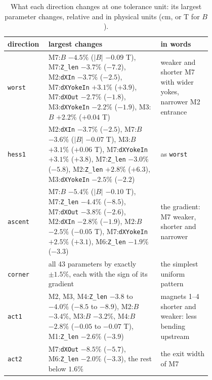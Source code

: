 \documentclass[11pt,a4paper]{article}
\begin{document}
\begin{table}[t]
\centering
\caption{What each direction changes at one tolerance unit: its largest parameter changes,
relative and in physical units (cm, or T for $B$).}
\label{tab:dirs}
\small
\begin{tabular}{l p{0.55\linewidth} p{0.25\linewidth}}
\toprule
direction & largest changes & in words \\
\midrule
\texttt{worst}  & M7:$B$ $-4.5\%$ ($|B|$ $-0.09$ T), M7:\texttt{Z\_len} $-3.7\%$ ($-7.2$),
                  M2:\texttt{dXIn} $-3.7\%$ ($-2.5$), M7:\texttt{dXYokeIn} $+3.1\%$ ($+3.9$),
                  M7:\texttt{dXOut} $-2.7\%$ ($-1.8$), M3:\texttt{dXYokeIn} $-2.2\%$ ($-1.9$),
                  M3:$B$ $+2.2\%$ ($+0.04$ T)
                & weaker and shorter M7 with wider yokes, narrower M2 entrance \\
\midrule
\texttt{hess1}  & M2:\texttt{dXIn} $-3.7\%$ ($-2.5$), M7:$B$ $-3.6\%$ ($|B|$ $-0.07$ T),
                  M3:$B$ $+3.1\%$ ($+0.06$ T), M7:\texttt{dXYokeIn} $+3.1\%$ ($+3.8$),
                  M7:\texttt{Z\_len} $-3.0\%$ ($-5.8$), M2:\texttt{Z\_len} $+2.8\%$ ($+6.3$),
                  M3:\texttt{dXYokeIn} $-2.5\%$ ($-2.2$)
                & as \texttt{worst} \\
\midrule
\texttt{ascent} & M7:$B$ $-5.4\%$ ($|B|$ $-0.10$ T), M7:\texttt{Z\_len} $-4.4\%$ ($-8.5$),
                  M7:\texttt{dXOut} $-3.8\%$ ($-2.6$), M2:\texttt{dXIn} $-2.8\%$ ($-1.9$),
                  M2:$B$ $-2.5\%$ ($-0.05$ T), M7:\texttt{dXYokeIn} $+2.5\%$ ($+3.1$),
                  M6:\texttt{Z\_len} $-1.9\%$ ($-3.3$)
                & the gradient: M7 weaker, shorter and narrower \\
\midrule
\texttt{corner} & all 43 parameters by exactly $\pm1.5\%$, each with the sign of its gradient
                & the simplest uniform pattern \\
\midrule
\texttt{act1}   & M2, M3, M4:\texttt{Z\_len} $-3.8$ to $-4.0\%$ ($-8.5$ to $-8.9$), M2:$B$ $-3.4\%$,
                  M3:$B$ $-3.2\%$, M4:$B$ $-2.8\%$ ($-0.05$ to $-0.07$ T), M1:\texttt{Z\_len}
                  $-2.6\%$ ($-3.9$)
                & magnets 1--4 shorter and weaker: less bending upstream \\
\midrule
\texttt{act2}   & M7:\texttt{dXOut} $-8.5\%$ ($-5.7$), M6:\texttt{Z\_len} $-2.0\%$ ($-3.3$), the
                  rest below $1.6\%$
                & the exit width of M7 \\
\bottomrule
\end{tabular}
\end{table}
\end{document}
